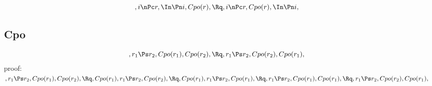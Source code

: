\[, i \nPc r, \In \Pn i, Cpo(r), \Rq , i \nPc r, Cpo(r), \In \Pn i, \]



\bigskip
\bigskip
\subsection{Cpo}
\[, r_1 \Ps r_2, Cpo(r_1), Cpo(r_2), \Rq , r_1 \Ps r_2, Cpo(r_2), Cpo(r_1), \]
proof:\\
\begin{math} 
, r_1 \Ps r_2, Cpo(r_1), Cpo(r_2),\\\\
\Rq, Cpo(r_1), r_1 \Ps r_2, Cpo(r_2), \\\\
\Rq, Cpo(r_1), r_1 \Ps r_2, Cpo(r_1), \\\\
\Rq, r_1 \Ps r_2, Cpo(r_1), Cpo(r_1), \\\\
\Rq, r_1 \Ps r_2, Cpo(r_2), Cpo(r_1),
\end{math}
\bigskip
\bigskip

